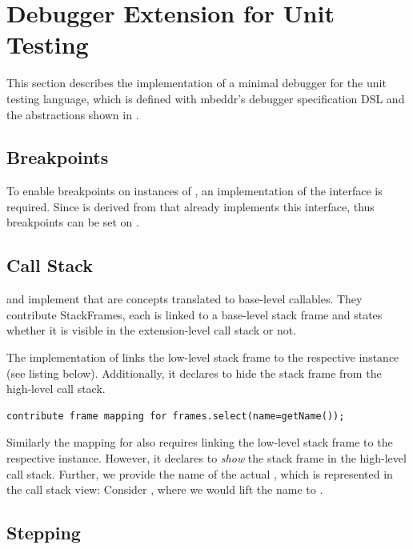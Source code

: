 \section{Debugger Extension for Unit Testing}

This section describes the implementation of a minimal debugger
for the unit testing language, which is defined with mbeddr's debugger
specification \ac{DSL} and the abstractions shown in .

\subsection{Breakpoints}  To enable
breakpoints on instances of , 
an implementation of the  interface is required. Since
 is derived from  that already implements this
interface, thus breakpoints can be set on .

\subsection{Call Stack}

 and  implement
 that are concepts translated to 
base-level callables. They contribute StackFrames, 
each is linked to a base-level stack frame and
states whether it is visible in the extension-level call stack or not.

The implementation of   links the
low-level stack frame to the respective instance (see listing below).
Additionally, it declares to hide the stack frame 
from the high-level call stack.

\begin{lstlisting}[language=debuggerDSL,frame=single]
contribute frame mapping for frames.select(name=getName());
\end{lstlisting}

Similarly the mapping for  also requires linking the
low-level stack frame to the respective instance. However, 
it declares to \emph{show} the stack frame in the high-level call stack.
Further, we provide the name of the actual , which is represented
in the call stack view: Consider , where we would
lift the name  to .

\subsection{Stepping} 

